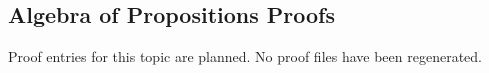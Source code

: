 \subsection*{Algebra of Propositions Proofs}

Proof entries for this topic are planned. No proof files have been regenerated.
